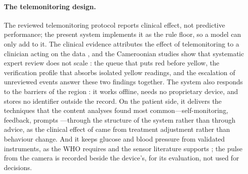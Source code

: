 \paragraph{The telemonitoring design.} The reviewed telemonitoring protocol \parencite{mihevc2025} reports clinical effect, not predictive performance; the present system implements it as the rule floor, so a model can only add to it. The clinical evidence attributes the effect of telemonitoring to a clinician acting on the data \parencite{mao2020,bandeira2024,mihevc2025}, and the Cameroonian studies show that systematic expert review does not scale \parencite{kingue2013,bediang2021}: the queue that puts red before yellow, the verification profile that absorbs isolated yellow readings, and the escalation of unreviewed events answer these two findings together. The system also responds to the barriers of the region \parencite{dodoo2022,agbeyangi2025}: it works offline, needs no proprietary device, and stores no identifier outside the record. On the patient side, it delivers the techniques that the content analyses found most common---self-monitoring, feedback, prompts \parencite{alessa2019}---through the structure of the system rather than through advice, as the clinical effect of \textcite{mihevc2025} came from treatment adjustment rather than behaviour change. And it keeps glucose and blood pressure from validated instruments, as the WHO requires and the sensor literature supports \parencite{who2023hypertension,alhaddad2022,liu2025ppg}; the pulse from the camera is recorded beside the device's, for its evaluation, not used for decisions.

